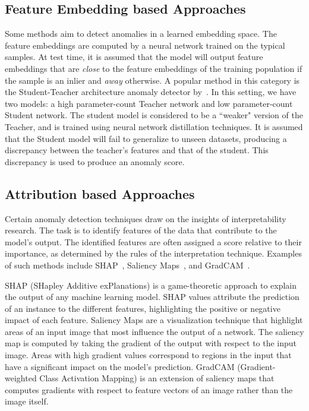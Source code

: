 \subsection*{Feature Embedding based Approaches}
Some methods aim to detect anomalies in a learned embedding space. The feature embeddings are computed by a neural network trained on the typical samples. At test time, it is assumed that the model will output feature embeddings that are \textit{close} to the feature embeddings of the training population if the sample is an inlier and \textit{away} otherwise. A popular method in this category is the Student-Teacher architecture anomaly detector by~\cite{bergmann2020uninformed}. In this setting, we have two models: a high parameter-count Teacher network and low parameter-count Student network. The student model is considered to be a ``weaker" version of the Teacher, and is trained using neural network distillation techniques. It is assumed that the Student model will fail to generalize to unseen datasets, producing a discrepancy between the teacher's features and that of the student. This discrepancy is used to produce an anomaly score.

\subsection*{Attribution based Approaches}
Certain anomaly detection techniques draw on the insights of interpretability research. The task is to identify features of the data that contribute to the model's output. The identified features are often assigned a score relative to their importance, as determined by the rules of the interpretation technique. Examples of such methods include SHAP~\cite{NIPS2017_7062}, Saliency Maps~\cite{Simonyan2013DeepIC}, and GradCAM~\cite{gradcam}.

SHAP (SHapley Additive exPlanations) is a game-theoretic approach to explain the output of any machine learning model. SHAP values attribute the prediction of an instance to the different features, highlighting the positive or negative impact of each feature. Saliency Maps are a visualization technique that highlight areas of an input image that most influence the output of a network. The saliency map is computed by taking the gradient of the output with respect to the input image. Areas with high gradient values correspond to regions in the input that have a significant impact on the model's prediction. GradCAM (Gradient-weighted Class Activation Mapping) is an extension of saliency maps that computes gradients with respect to feature vectors of an image rather than the image itself.

